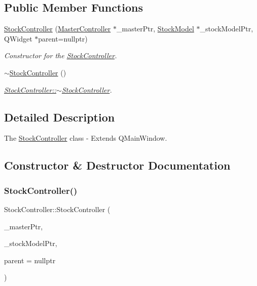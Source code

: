 \subsection*{Public Member Functions}
\begin{DoxyCompactItemize}
\item 
\mbox{\hyperlink{class_stock_controller_a52f8339b482e7b09650a7f78ec0e8344}{Stock\+Controller}} (\mbox{\hyperlink{class_master_controller}{Master\+Controller}} $\ast$\+\_\+master\+Ptr, \mbox{\hyperlink{class_stock_model}{Stock\+Model}} $\ast$\+\_\+stock\+Model\+Ptr, Q\+Widget $\ast$parent=nullptr)
\begin{DoxyCompactList}\small\item\em Constructor for the \mbox{\hyperlink{class_stock_controller}{Stock\+Controller}}. \end{DoxyCompactList}\item 
\mbox{\label{class_stock_controller_a733705682ab5d9861503ea6d21f8b575}} 
\mbox{\hyperlink{class_stock_controller_a733705682ab5d9861503ea6d21f8b575}{$\sim$\+Stock\+Controller}} ()
\begin{DoxyCompactList}\small\item\em \mbox{\hyperlink{class_stock_controller_a733705682ab5d9861503ea6d21f8b575}{Stock\+Controller\+::$\sim$\+Stock\+Controller}}. \end{DoxyCompactList}\end{DoxyCompactItemize}


\subsection{Detailed Description}
The \mbox{\hyperlink{class_stock_controller}{Stock\+Controller}} class -\/ Extends Q\+Main\+Window. 

\subsection{Constructor \& Destructor Documentation}
\mbox{\label{class_stock_controller_a52f8339b482e7b09650a7f78ec0e8344}} 
\subsubsection{\texorpdfstring{Stock\+Controller()}{StockController()}}
{\footnotesize\ttfamily Stock\+Controller\+::\+Stock\+Controller (\begin{DoxyParamCaption}\item[{\mbox{\hyperlink{class_master_controller}{Master\+Controller}} $\ast$}]{\+\_\+master\+Ptr,  }\item[{\mbox{\hyperlink{class_stock_model}{Stock\+Model}} $\ast$}]{\+\_\+stock\+Model\+Ptr,  }\item[{Q\+Widget $\ast$}]{parent = {\ttfamily nullptr} }\end{DoxyParamCaption})\hspace{0.3cm}{\ttfamily [explicit]}}



